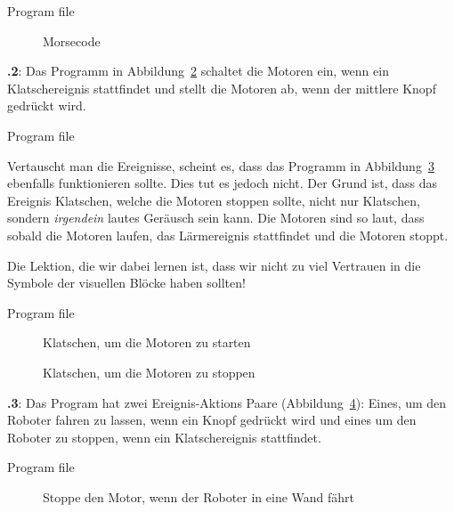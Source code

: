 \documentclass[12pt,a4paper,english]{article}
\begin{document}
{\raggedleft \hfill Program file }

\begin{figure}
\begin{center}
\caption{Morsecode}\label{fig.morse}
\end{center}
\end{figure}


\textbf{\thesection.2}: 
Das Programm in Abbildung~\ref{fig.clap-to-start} schaltet die Motoren ein, wenn ein Klatschereignis stattfindet und stellt die Motoren ab, wenn der mittlere Knopf gedrückt wird.


{\raggedleft \hfill Program file }

Vertauscht man die Ereignisse, scheint es, dass das Programm in Abbildung~\ref{fig.clap-to-stop}  ebenfalls funktionieren sollte. Dies tut es jedoch nicht. Der Grund ist, dass das Ereignis Klatschen, welche die Motoren stoppen sollte, nicht nur Klatschen, sondern \emph{irgendein} lautes Geräusch sein kann. Die Motoren sind so laut, dass sobald die Motoren laufen, das Lärmereignis stattfindet und die Motoren stoppt. 

Die Lektion, die wir dabei lernen ist, dass wir nicht zu viel Vertrauen in die Symbole der visuellen Blöcke haben sollten!

{\raggedleft \hfill Program file }

\begin{figure}
\begin{center}
\caption{Klatschen, um die Motoren zu starten}\label{fig.clap-to-start}
\end{center}
\end{figure}

\begin{figure}[hbt]
\begin{center}
\caption{Klatschen, um die Motoren zu stoppen}\label{fig.clap-to-stop}
\end{center}
\end{figure}

\textbf{\thesection.3}:
Das Program hat zwei Ereignis-Aktions Paare (Abbildung~\ref{fig.bump}): Eines, um den Roboter fahren zu lassen, wenn ein Knopf gedrückt wird und eines um den Roboter zu stoppen, wenn ein Klatschereignis stattfindet.

{\raggedleft \hfill Program file }

\begin{figure}[hbt]
\begin{center}
\caption{Stoppe den Motor, wenn der Roboter in eine Wand fährt}\label{fig.bump}
\end{center}
\end{figure}
\end{document}
